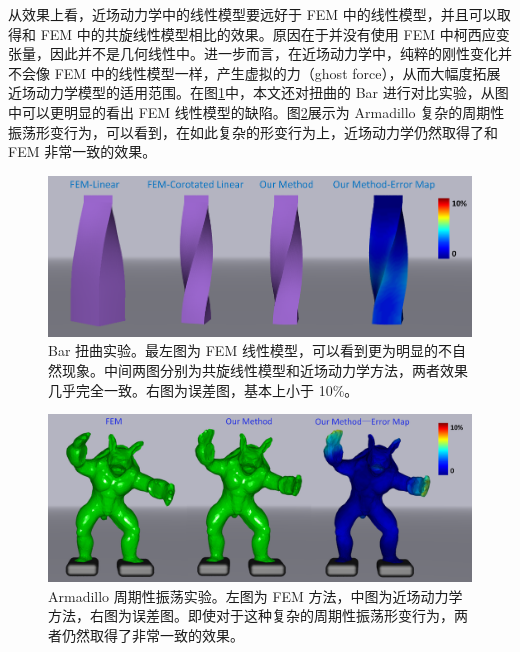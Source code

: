 从效果上看，近场动力学中的线性模型要远好于 FEM 中的线性模型，并且可以取得和 FEM 中的共旋线性模型相比的效果。原因在于并没有使用 FEM 中柯西应变张量，因此并不是几何线性中。进一步而言，在近场动力学中，纯粹的刚性变化并不会像 FEM 中的线性模型一样，产生虚拟的力（ghost force），从而大幅度拓展近场动力学模型的适用范围。在图\ref{demo_bar_twist_vs_fem}中，本文还对扭曲的 Bar 进行对比实验，从图中可以更明显的看出 FEM 线性模型的缺陷。图\ref{demo_armadillo_vs_fem}展示为 Armadillo 复杂的周期性振荡形变行为，可以看到，在如此复杂的形变行为上，近场动力学仍然取得了和 FEM 非常一致的效果。

\begin{figure}[!htb]
  \centering
  \captionsetup{justification=centering}
  \includegraphics[width=0.9\linewidth]{chap/image/demo_bar_twist_vs_fem}

  \caption{\label{demo_bar_twist_vs_fem}
           Bar 扭曲实验。最左图为 FEM 线性模型，可以看到更为明显的不自然现象。中间两图分别为共旋线性模型和近场动力学方法，两者效果几乎完全一致。右图为误差图，基本上小于 10\%。
          }
\end{figure}

\begin{figure}[!htb]
  \centering
  \captionsetup{justification=centering}
  \includegraphics[width=0.9\linewidth]{chap/image/demo_armadillo_vs_fem}

  \caption{\label{demo_armadillo_vs_fem}
           Armadillo 周期性振荡实验。左图为 FEM 方法，中图为近场动力学方法，右图为误差图。即使对于这种复杂的周期性振荡形变行为，两者仍然取得了非常一致的效果。
          }
\end{figure}

